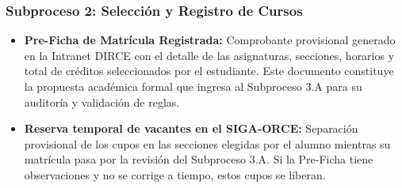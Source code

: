 \subsubsection{Subproceso 2: Selección y Registro de Cursos}

\begin{itemize}
    \item \textbf{Pre-Ficha de Matrícula Registrada:} Comprobante provisional generado en la Intranet DIRCE con el detalle de las asignaturas, secciones, horarios y total de créditos seleccionados por el estudiante. Este documento constituye la propuesta académica formal que ingresa al Subproceso 3.A para su auditoría y validación de reglas.

    \item \textbf{Reserva temporal de vacantes en el SIGA-ORCE:} Separación provisional de los cupos en las secciones elegidas por el alumno mientras su matrícula pasa por la revisión del Subproceso 3.A. Si la Pre-Ficha tiene observaciones y no se corrige a tiempo, estos cupos se liberan.
\end{itemize}
